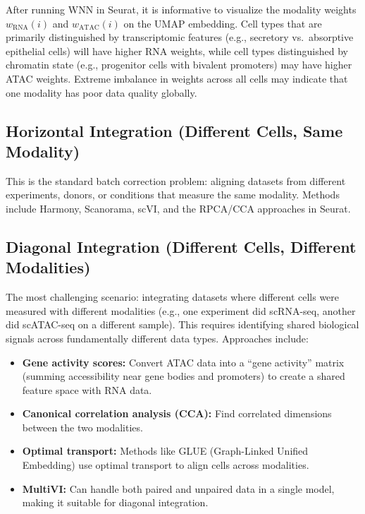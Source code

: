 \begin{tipbox}[title={Inspecting WNN Modality Weights}]
After running WNN in Seurat, it is informative to visualize the modality weights $w_{\text{RNA}}(i)$ and $w_{\text{ATAC}}(i)$ on the UMAP embedding. Cell types that are primarily distinguished by transcriptomic features (e.g., secretory vs.\ absorptive epithelial cells) will have higher RNA weights, while cell types distinguished by chromatin state (e.g., progenitor cells with bivalent promoters) may have higher ATAC weights. Extreme imbalance in weights across all cells may indicate that one modality has poor data quality globally.
\end{tipbox}

\subsection{Horizontal Integration (Different Cells, Same Modality)}
\label{subsec:multiomics:horizontal}

This is the standard batch correction problem: aligning datasets from different experiments, donors, or conditions that measure the same modality. Methods include Harmony, Scanorama, scVI, and the RPCA/CCA approaches in Seurat.

\subsection{Diagonal Integration (Different Cells, Different Modalities)}
\label{subsec:multiomics:diagonal}

The most challenging scenario: integrating datasets where different cells were measured with different modalities (e.g., one experiment did scRNA-seq, another did scATAC-seq on a different sample). This requires identifying shared biological signals across fundamentally different data types. Approaches include:

\begin{itemize}[itemsep=2pt]
  \item \textbf{Gene activity scores:} Convert ATAC data into a ``gene activity'' matrix (summing accessibility near gene bodies and promoters) to create a shared feature space with RNA data.
  \item \textbf{Canonical correlation analysis (CCA):} Find correlated dimensions between the two modalities.
  \item \textbf{Optimal transport:} Methods like GLUE (Graph-Linked Unified Embedding) use optimal transport to align cells across modalities.
  \item \textbf{MultiVI:} Can handle both paired and unpaired data in a single model, making it suitable for diagonal integration.
\end{itemize}

